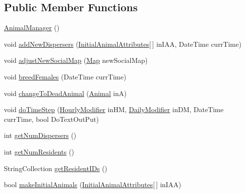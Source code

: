 \subsection*{Public Member Functions}
\begin{DoxyCompactItemize}
\item 
\hyperlink{class_p_a_z___dispersal_1_1_animal_manager_a9db71d99335128629660dec774ad6f7d}{Animal\-Manager} ()
\item 
void \hyperlink{class_p_a_z___dispersal_1_1_animal_manager_a6a2fa1e1d94744a986e9cdb843de99bd}{add\-New\-Dispersers} (\hyperlink{class_p_a_z___dispersal_1_1_initial_animal_attributes}{Initial\-Animal\-Attributes}\mbox{[}$\,$\mbox{]} in\-I\-A\-A, Date\-Time curr\-Time)
\item 
void \hyperlink{class_p_a_z___dispersal_1_1_animal_manager_a9c4b24baa883d824e7a5551dbc33aab1}{adjust\-New\-Social\-Map} (\hyperlink{class_p_a_z___dispersal_1_1_map}{Map} new\-Social\-Map)
\item 
void \hyperlink{class_p_a_z___dispersal_1_1_animal_manager_aef46e1b47dcb503dd66c34fff1888fb2}{breed\-Females} (Date\-Time curr\-Time)
\item 
void \hyperlink{class_p_a_z___dispersal_1_1_animal_manager_a0d495f55455d215e813986407bb7992f}{change\-To\-Dead\-Animal} (\hyperlink{class_p_a_z___dispersal_1_1_animal}{Animal} in\-A)
\item 
void \hyperlink{class_p_a_z___dispersal_1_1_animal_manager_aac50f34804f4df039b14ddc836f9221a}{do\-Time\-Step} (\hyperlink{class_p_a_z___dispersal_1_1_hourly_modifier}{Hourly\-Modifier} in\-H\-M, \hyperlink{class_p_a_z___dispersal_1_1_daily_modifier}{Daily\-Modifier} in\-D\-M, Date\-Time curr\-Time, bool Do\-Text\-Out\-Put)
\item 
int \hyperlink{class_p_a_z___dispersal_1_1_animal_manager_acee091d7dbf9f896f050665ee8aadcae}{get\-Num\-Dispersers} ()
\item 
int \hyperlink{class_p_a_z___dispersal_1_1_animal_manager_adea4d0fd470a410579a9b2c2008202b2}{get\-Num\-Residents} ()
\item 
String\-Collection \hyperlink{class_p_a_z___dispersal_1_1_animal_manager_a474c03f67b51b444ca232b9a977f6b7b}{get\-Resident\-I\-Ds} ()
\item 
bool \hyperlink{class_p_a_z___dispersal_1_1_animal_manager_a71e2e2ddb19f881f520f4a55d940dbfe}{make\-Initial\-Animals} (\hyperlink{class_p_a_z___dispersal_1_1_initial_animal_attributes}{Initial\-Animal\-Attributes}\mbox{[}$\,$\mbox{]} in\-I\-A\-A)
\item 

\end{DoxyCompactItemize}
